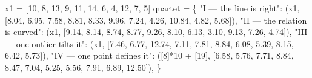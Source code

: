 \documentclass[
  letterpaper,
  10pt,
  twoside,
  openright,
  numbers=noenddot,
  chapterprefix=true]{scrbook}
\newenvironment{Shaded}{}{}
\newcommand{\DecValTok}[1]{\textcolor[rgb]{0.00,0.36,0.77}{#1}}
\newcommand{\FloatTok}[1]{\textcolor[rgb]{0.00,0.36,0.77}{#1}}
\newcommand{\NormalTok}[1]{\textcolor[rgb]{0.14,0.16,0.18}{#1}}
\newcommand{\OperatorTok}[1]{\textcolor[rgb]{0.14,0.16,0.18}{#1}}
\newcommand{\StringTok}[1]{\textcolor[rgb]{0.01,0.18,0.38}{#1}}
\begin{document}
\begin{Shaded}
\begin{Highlighting}[]
\NormalTok{x1 }\OperatorTok{=}\NormalTok{ [}\DecValTok{10}\NormalTok{, }\DecValTok{8}\NormalTok{, }\DecValTok{13}\NormalTok{, }\DecValTok{9}\NormalTok{, }\DecValTok{11}\NormalTok{, }\DecValTok{14}\NormalTok{, }\DecValTok{6}\NormalTok{, }\DecValTok{4}\NormalTok{, }\DecValTok{12}\NormalTok{, }\DecValTok{7}\NormalTok{, }\DecValTok{5}\NormalTok{]}
\NormalTok{quartet }\OperatorTok{=}\NormalTok{ \{}
    \StringTok{"I — the line is right"}\NormalTok{:        (x1, [}\FloatTok{8.04}\NormalTok{, }\FloatTok{6.95}\NormalTok{, }\FloatTok{7.58}\NormalTok{, }\FloatTok{8.81}\NormalTok{, }\FloatTok{8.33}\NormalTok{, }\FloatTok{9.96}\NormalTok{, }\FloatTok{7.24}\NormalTok{, }\FloatTok{4.26}\NormalTok{, }\FloatTok{10.84}\NormalTok{, }\FloatTok{4.82}\NormalTok{, }\FloatTok{5.68}\NormalTok{]),}
    \StringTok{"II — the relation is curved"}\NormalTok{:  (x1, [}\FloatTok{9.14}\NormalTok{, }\FloatTok{8.14}\NormalTok{, }\FloatTok{8.74}\NormalTok{, }\FloatTok{8.77}\NormalTok{, }\FloatTok{9.26}\NormalTok{, }\FloatTok{8.10}\NormalTok{, }\FloatTok{6.13}\NormalTok{, }\FloatTok{3.10}\NormalTok{, }\FloatTok{9.13}\NormalTok{, }\FloatTok{7.26}\NormalTok{, }\FloatTok{4.74}\NormalTok{]),}
    \StringTok{"III — one outlier tilts it"}\NormalTok{:   (x1, [}\FloatTok{7.46}\NormalTok{, }\FloatTok{6.77}\NormalTok{, }\FloatTok{12.74}\NormalTok{, }\FloatTok{7.11}\NormalTok{, }\FloatTok{7.81}\NormalTok{, }\FloatTok{8.84}\NormalTok{, }\FloatTok{6.08}\NormalTok{, }\FloatTok{5.39}\NormalTok{, }\FloatTok{8.15}\NormalTok{, }\FloatTok{6.42}\NormalTok{, }\FloatTok{5.73}\NormalTok{]),}
    \StringTok{"IV — one point defines it"}\NormalTok{:    ([}\DecValTok{8}\NormalTok{]}\OperatorTok{*}\DecValTok{10} \OperatorTok{+}\NormalTok{ [}\DecValTok{19}\NormalTok{], [}\FloatTok{6.58}\NormalTok{, }\FloatTok{5.76}\NormalTok{, }\FloatTok{7.71}\NormalTok{, }\FloatTok{8.84}\NormalTok{, }\FloatTok{8.47}\NormalTok{, }\FloatTok{7.04}\NormalTok{, }\FloatTok{5.25}\NormalTok{, }\FloatTok{5.56}\NormalTok{, }\FloatTok{7.91}\NormalTok{, }\FloatTok{6.89}\NormalTok{, }\FloatTok{12.50}\NormalTok{]),}
\NormalTok{\}}


\end{Highlighting}
\end{Shaded}
\end{document}
